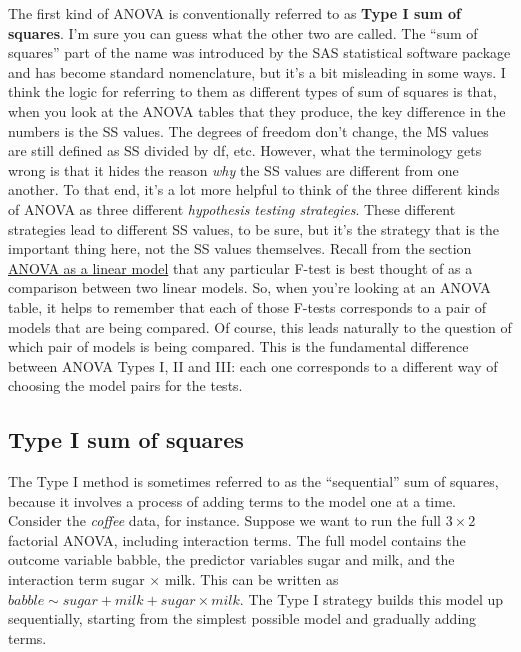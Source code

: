 \documentclass[
  a4paper,
]{book}
\begin{document}
The first kind of ANOVA is conventionally referred to as \textbf{Type I
sum of squares}. I'm sure you can guess what the other two are called.
The ``sum of squares'' part of the name was introduced by the SAS
statistical software package and has become standard nomenclature, but
it's a bit misleading in some ways. I think the logic for referring to
them as different types of sum of squares is that, when you look at the
ANOVA tables that they produce, the key difference in the numbers is the
SS values. The degrees of freedom don't change, the MS values are still
defined as SS divided by df, etc. However, what the terminology gets
wrong is that it hides the reason \emph{why} the SS values are different
from one another. To that end, it's a lot more helpful to think of the
three different kinds of ANOVA as three different \emph{hypothesis
testing strategies}. These different strategies lead to different SS
values, to be sure, but it's the strategy that is the important thing
here, not the SS values themselves. Recall from the section
\protect\hyperlink{sec-ANOVA-as-a-linear-model}{ANOVA as a linear model}
that any particular F-test is best thought of as a comparison between
two linear models. So, when you're looking at an ANOVA table, it helps
to remember that each of those F-tests corresponds to a pair of models
that are being compared. Of course, this leads naturally to the question
of which pair of models is being compared. This is the fundamental
difference between ANOVA Types I, II and III: each one corresponds to a
different way of choosing the model pairs for the tests.

\hypertarget{type-i-sum-of-squares}{%
\subsection{Type I sum of squares}\label{type-i-sum-of-squares}}

The Type I method is sometimes referred to as the ``sequential'' sum of
squares, because it involves a process of adding terms to the model one
at a time. Consider the \emph{coffee} data, for instance. Suppose we
want to run the full \(3 \times 2\) factorial ANOVA, including
interaction terms. The full model contains the outcome variable babble,
the predictor variables sugar and milk, and the interaction term sugar
\(\times\) milk. This can be written as
\(babble \sim sugar + milk + sugar {\times} milk\). The Type I strategy
builds this model up sequentially, starting from the simplest possible
model and gradually adding terms.
\end{document}
